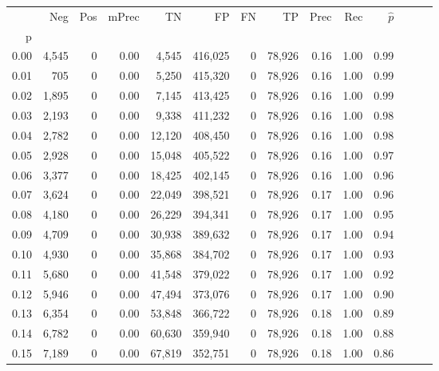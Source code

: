 \begin{tabular}{rrrrrrrrrrrrrr}
\toprule
{} &    Neg &    Pos & mPrec &       TN &       FP &      FN &      TP &  Prec &   Rec & $\hat{p}$ \\
p    &        &        &       &          &          &         &         &       &       &           \\
\midrule
0.00 &  4,545 &      0 &  0.00 &    4,545 &  416,025 &       0 &  78,926 &  0.16 &  1.00 &      0.99 \\
0.01 &    705 &      0 &  0.00 &    5,250 &  415,320 &       0 &  78,926 &  0.16 &  1.00 &      0.99 \\
0.02 &  1,895 &      0 &  0.00 &    7,145 &  413,425 &       0 &  78,926 &  0.16 &  1.00 &      0.99 \\
0.03 &  2,193 &      0 &  0.00 &    9,338 &  411,232 &       0 &  78,926 &  0.16 &  1.00 &      0.98 \\
0.04 &  2,782 &      0 &  0.00 &   12,120 &  408,450 &       0 &  78,926 &  0.16 &  1.00 &      0.98 \\
0.05 &  2,928 &      0 &  0.00 &   15,048 &  405,522 &       0 &  78,926 &  0.16 &  1.00 &      0.97 \\
0.06 &  3,377 &      0 &  0.00 &   18,425 &  402,145 &       0 &  78,926 &  0.16 &  1.00 &      0.96 \\
0.07 &  3,624 &      0 &  0.00 &   22,049 &  398,521 &       0 &  78,926 &  0.17 &  1.00 &      0.96 \\
0.08 &  4,180 &      0 &  0.00 &   26,229 &  394,341 &       0 &  78,926 &  0.17 &  1.00 &      0.95 \\
0.09 &  4,709 &      0 &  0.00 &   30,938 &  389,632 &       0 &  78,926 &  0.17 &  1.00 &      0.94 \\
0.10 &  4,930 &      0 &  0.00 &   35,868 &  384,702 &       0 &  78,926 &  0.17 &  1.00 &      0.93 \\
0.11 &  5,680 &      0 &  0.00 &   41,548 &  379,022 &       0 &  78,926 &  0.17 &  1.00 &      0.92 \\
0.12 &  5,946 &      0 &  0.00 &   47,494 &  373,076 &       0 &  78,926 &  0.17 &  1.00 &      0.90 \\
0.13 &  6,354 &      0 &  0.00 &   53,848 &  366,722 &       0 &  78,926 &  0.18 &  1.00 &      0.89 \\
0.14 &  6,782 &      0 &  0.00 &   60,630 &  359,940 &       0 &  78,926 &  0.18 &  1.00 &      0.88 \\
0.15 &  7,189 &      0 &  0.00 &   67,819 &  352,751 &       0 &  78,926 &  0.18 &  1.00 &      0.86 \\

\end{tabular}
